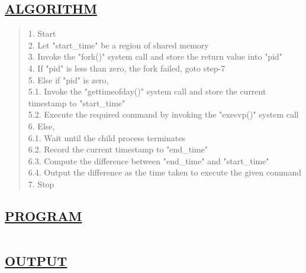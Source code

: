 \documentclass[a4paper, 12pt]{article}
\begin{document}
\subsection*{\underline{ALGORITHM}}
\begin{quote}
1. Start\\
2. Let "start\_time" be a region of shared memory\\
3. Invoke the "fork()" system call and store the return value into "pid"\\
4. If "pid" is less than zero, the fork failed, goto step-7\\
5. Else if "pid" is zero, \\
\hspace*{1cm} 5.1. Invoke the "gettimeofday()" system call and store the current timestamp to \hspace*{2cm} "start\_time"\\
\hspace*{1cm} 5.2. Execute the required command by invoking the "execvp()" system call\\
6. Else,\\
\hspace*{1cm} 6.1. Wait until the child process terminates\\
\hspace*{1cm} 6.2. Record the current timestamp to "end\_time"\\
\hspace*{1cm} 6.3. Compute the difference between "end\_time" and "start\_time"\\
\hspace*{1cm} 6.4. Output the difference as the time taken to execute the given command\\
7. Stop\\
\end{quote}

\subsection*{\underline{PROGRAM}}
\begin{quote}
\inputminted[fontsize=\small,breaklines,breakanywhere]{c}{shared_memory_ipc.c}
\end{quote}

\newpage
\subsection*{\underline{OUTPUT}}

\begin{figure}[H] 
    \centering
\end{figure}
\end{document}
